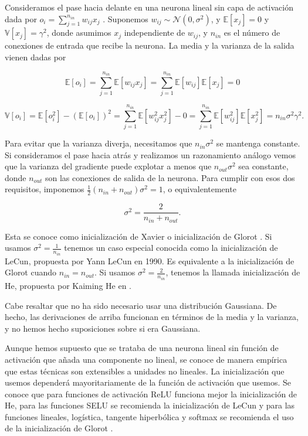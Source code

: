 Consideramos el pase hacia delante en una neurona lineal sin capa de activación dada por $o_i = \sum_{j=1}^{n_{in}} w_{ij}x_j$ . Suponemos $w_{ij} \sim \mathcal{N}(0, \sigma^2)$, y $\mathbb{E}[x_j]=0$ y $\mathbb{V}[x_j]=\gamma^2$, donde asumimos $x_j$ independiente de $w_{ij}$, y $n_{in}$ es el número de conexiones de entrada que recibe la neurona. La media y la varianza de la salida vienen dadas por

$$\mathbb{E}[o_i]= \sum_{j=1}^{n_{in}} \mathbb{E}[w_{ij} x_j] = \sum_{j=1}^{n_{in}} \mathbb{E}[w_{ij}] \mathbb{E}[x_j]=0$$

$$\mathbb{V}[o_i] = \mathbb{E}[o_i^2] - (\mathbb{E}[o_i])^2 = \sum_{j=1}^{n_{in}} \mathbb{E}[w_{ij}^2x_j^2] - 0 = \sum_{j=1}^{n_{in}} \mathbb{E}[w_{ij}^2] \mathbb{E}[x_j^2] = n_{in} \sigma^2 \gamma^2.$$

Para evitar que la varianza diverja, necesitamos que $n_{in} \sigma^2$ se mantenga constante. Si consideramos el pase hacia atrás y realizamos un razonamiento análogo vemos que la varianza del gradiente puede explotar a menos que $n_{out} \sigma^2$ sea constante, donde $n_{out}$ son las conexiones de salida de la neurona. Para cumplir con esos dos requisitos, imponemos $\frac{1}{2}(n_{in}+n_{out}) \sigma^2 = 1$, o equivalentemente

$$\sigma^2= \frac{2}{n_{in}+n_{out}}.$$

Esta se conoce como inicialización de Xavier o inicialización de Glorot \cite{stabilityProblem2}. Si usamos $\sigma^2= \frac{1}{n_{in}}$ tenemos un caso especial conocida como la inicialización de LeCun, propuesta por Yann LeCun en 1990. Es equivalente a la inicialización de Glorot cuando $n_{in}=n_{out}$. Si usamos $\sigma^2 = \frac{2}{n_{in}}$, tenemos la llamada inicialización de He, propuesta por Kaiming He en \cite{heinic}.


Cabe resaltar que no ha sido necesario usar una distribución Gaussiana. De hecho, las derivaciones de arriba funcionan en términos de la media y la varianza, y no hemos hecho suposiciones sobre si era Gaussiana. 


Aunque hemos supuesto que se trataba de una neurona lineal sin función de activación que añada una componente no lineal, se conoce de manera empírica que estas técnicas son extensibles a unidades no lineales. La inicialización que usemos dependerá mayoritariamente de la función de activación que usemos. Se conoce que para funciones de activación ReLU funciona mejor la inicialización de He, para las funciones SELU se recomienda la inicialización de LeCun y para las funciones lineales, logística, tangente hiperbólica y softmax se recomienda el uso de la inicialización de Glorot \cite{murphy2022probabilistic}.